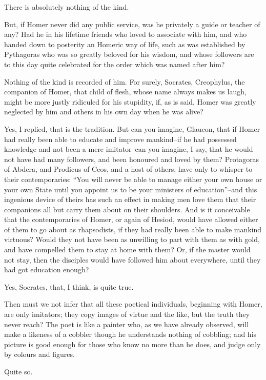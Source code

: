 There is absolutely nothing of the kind.

But, if Homer never did any public service, was he privately a guide or
teacher of any? Had he in his lifetime friends who loved to associate
with him, and who handed down to posterity an Homeric way of life, such
as was established by Pythagoras who was so greatly beloved for his
wisdom, and whose followers are to this day quite celebrated for the
order which was named after him?

Nothing of the kind is recorded of him. For surely, Socrates,
Creophylus, the companion of Homer, that child of flesh, whose name
always makes us laugh, might be more justly ridiculed for his stupidity,
if, as is said, Homer was greatly neglected by him and others in his own
day when he was alive?

Yes, I replied, that is the tradition. But can you imagine, Glaucon,
that if Homer had really been able to educate and improve mankind--if he
had possessed knowledge and not been a mere imitator--can you imagine,
I say, that he would not have had many followers, and been honoured and
loved by them? Protagoras of Abdera, and Prodicus of Ceos, and a host of
others, have only to whisper to their contemporaries: ``You will never be
able to manage either your own house or your own State until you appoint
us to be your ministers of education''--and this ingenious device of
theirs has such an effect in making men love them that their companions
all but carry them about on their shoulders. And is it conceivable that
the contemporaries of Homer, or again of Hesiod, would have allowed
either of them to go about as rhapsodists, if they had really been able
to make mankind virtuous? Would they not have been as unwilling to part
with them as with gold, and have compelled them to stay at home with
them? Or, if the master would not stay, then the disciples would have
followed him about everywhere, until they had got education enough?

Yes, Socrates, that, I think, is quite true.

Then must we not infer that all these poetical individuals, beginning
with Homer, are only imitators; they copy images of virtue and the like,
but the truth they never reach? The poet is like a painter who, as
we have already observed, will make a likeness of a cobbler though he
understands nothing of cobbling; and his picture is good enough for
those who know no more than he does, and judge only by colours and
figures.

Quite so.


